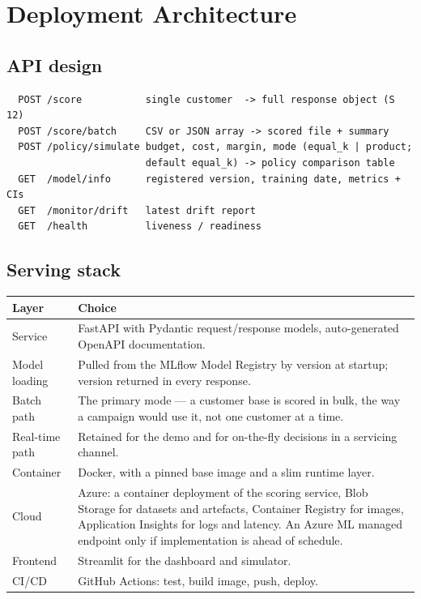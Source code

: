 \documentclass[11pt,a4paper]{article}
\begin{document}
\section{Deployment Architecture}
\label{sec:deployment}

\subsection{API design}

{\footnotesize
\begin{verbatim}
  POST /score           single customer  -> full response object (S 12)
  POST /score/batch     CSV or JSON array -> scored file + summary
  POST /policy/simulate budget, cost, margin, mode (equal_k | product;
                        default equal_k) -> policy comparison table
  GET  /model/info      registered version, training date, metrics + CIs
  GET  /monitor/drift   latest drift report
  GET  /health          liveness / readiness
\end{verbatim}}

\subsection{Serving stack}

\begin{tabularx}{\textwidth}{@{}L{3.6cm}X@{}}
\toprule
\textbf{Layer} & \textbf{Choice} \\
\midrule
Service & FastAPI with Pydantic request/response models, auto-generated OpenAPI documentation. \\
Model loading & Pulled from the MLflow Model Registry by version at startup; version returned in
every response. \\
Batch path & The primary mode --- a customer base is scored in bulk, the way a campaign would
use it, not one customer at a time. \\
Real-time path & Retained for the demo and for on-the-fly decisions in a servicing channel. \\
Container & Docker, with a pinned base image and a slim runtime layer. \\
Cloud & Azure: a container deployment of the scoring service, Blob Storage for datasets and
artefacts, Container Registry for images, Application Insights for logs and latency. An Azure ML
managed endpoint only if implementation is ahead of schedule. \\
Frontend & Streamlit for the dashboard and simulator. \\
CI/CD & GitHub Actions: test, build image, push, deploy. \\
\bottomrule
\end{tabularx}
\end{document}

